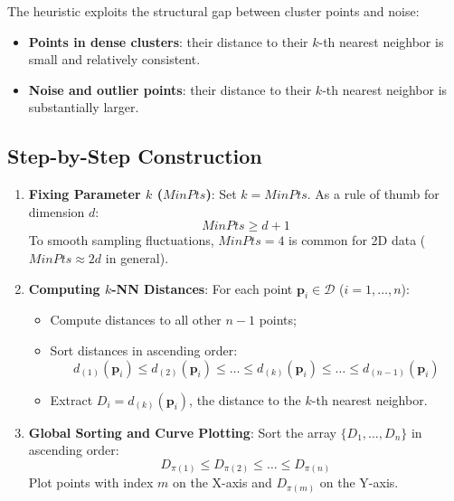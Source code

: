 The heuristic exploits the structural gap between cluster points and noise:
\begin{itemize}
    \item \textbf{Points in dense clusters}: their distance to their $k$-th nearest neighbor is small and relatively consistent.
    \item \textbf{Noise and outlier points}: their distance to their $k$-th nearest neighbor is substantially larger.
\end{itemize}

\subsection{Step-by-Step Construction}

\begin{enumerate}
    \item \textbf{Fixing Parameter $k$ ($MinPts$)}: Set $k = MinPts$. As a rule of thumb for dimension $d$:
    \begin{equation}
        MinPts \ge d + 1
    \end{equation}
    To smooth sampling fluctuations, $MinPts = 4$ is common for 2D data ($MinPts \approx 2d$ in general).

    \item \textbf{Computing $k$-NN Distances}: For each point $\mathbf{p}_i \in \mathcal{D}$ ($i = 1, \dots, n$):
    \begin{itemize}[noitemsep]
        \item Compute distances to all other $n-1$ points;
        \item Sort distances in ascending order:
        \begin{equation}
            d_{(1)}(\mathbf{p}_i) \le d_{(2)}(\mathbf{p}_i) \le \dots \le d_{(k)}(\mathbf{p}_i) \le \dots \le d_{(n-1)}(\mathbf{p}_i)
        \end{equation}
        \item Extract $D_i = d_{(k)}(\mathbf{p}_i)$, the distance to the $k$-th nearest neighbor.
    \end{itemize}

    \item \textbf{Global Sorting and Curve Plotting}: Sort the array $\{D_1, \dots, D_n\}$ in ascending order:
    \begin{equation}
        D_{\pi(1)} \le D_{\pi(2)} \le \dots \le D_{\pi(n)}
    \end{equation}
    Plot points with index $m$ on the X-axis and $D_{\pi(m)}$ on the Y-axis.


\end{enumerate}
